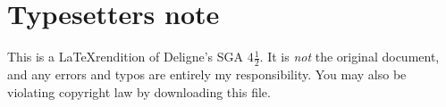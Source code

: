 \section*{Typesetters note}

This is a \LaTeX rendition of Deligne's SGA $4\frac 1 2$. It is \emph{not} the 
original document, and any errors and typos are entirely my responsibility. 
You may also be violating copyright law by downloading this file. 
